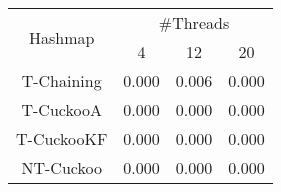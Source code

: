 \begin{tabular}{|c|c|c|c|}
\hline
\multirow{2}{*}{Hashmap} & \multicolumn{3}{c|}{\#Threads}\\\cline{2-4}& 4 & 12 & 20\\
\hline
\hline
T-Chaining & 0.000 & 0.006 & 0.000\\
T-CuckooA & 0.000 & 0.000 & 0.000\\
T-CuckooKF & 0.000 & 0.000 & 0.000\\
NT-Cuckoo & 0.000 & 0.000 & 0.000\\
\hline
\end{tabular}
